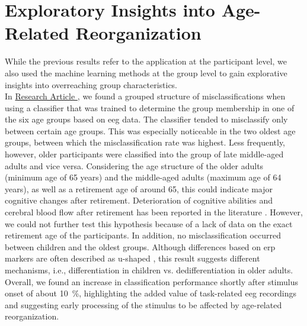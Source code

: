 \section{Exploratory Insights into Age-Related Reorganization}
While the previous results refer to the application at the participant level, we also used the machine learning methods at the group level to gain explorative insights into overreaching group characteristics.\\
In \hyperref[results:paperII]{Research Article }, we found a grouped structure of misclassifications when using a classifier that was trained to determine the group membership in one of the six age groups based on \gls{eeg} data. The classifier tended to misclassify only between certain age groups. This was especially noticeable in the two oldest age groups, between which the misclassification rate was highest. Less frequently, however, older participants were classified into the group of late middle-aged adults and vice versa. Considering the age structure of the older adults (minimum age of 65 years) and the middle-aged adults (maximum age of 64 years), as well as a retirement age of around 65, this could indicate major cognitive changes after retirement. Deterioration of cognitive abilities and cerebral blood flow after retirement has been reported in the literature \cite{Celidoni2017, Rohwedder2010, Rogers1990}. However, we could not further test this hypothesis because of a lack of data on the exact retirement age of the participants. In addition, no misclassification occurred between children and the oldest groups. Although differences based on \gls{erp} markers are often described as u-shaped \cite{Mueller2008, Reuter2019}, this result suggests different mechanisms, i.e., differentiation in children vs. dedifferentiation in older adults. Overall, we found an increase in classification performance shortly after stimulus onset of about 10~\%, highlighting the added value of task-related \gls{eeg} recordings and suggesting early processing of the stimulus to be affected by age-related reorganization.\\
